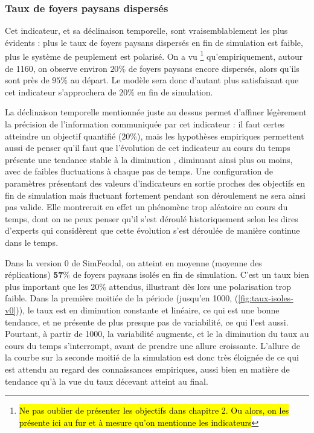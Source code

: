 \subsubsection{Taux de foyers paysans dispersés}

Cet indicateur, et sa déclinaison temporelle, sont vraisemblablement les plus évidents :
plus le taux de foyers paysans dispersés en fin de simulation est faible, plus le système de peuplement est polarisé.
On a vu \footnote{\hl{Ne pas oublier de présenter les objectifs dans chapitre 2. Ou alors, on les présente ici au fur et à mesure qu'on mentionne les indicateurs}} qu'empiriquement, autour de 1160, on observe environ $20\%$ de foyers paysans encore dispersés, alors qu'ils sont près de $95\%$ au départ.
Le modèle sera donc d'autant plus satisfaisant que cet indicateur s'approchera de $20\%$ en fin de simulation.

La \og déclinaison temporelle\fg{} mentionnée juste au dessus permet d'affiner légèrement la précision de l'information communiquée par cet indicateur :
il faut certes atteindre un objectif quantifié ($20\%$), mais les hypothèses empiriques permettent aussi de penser qu'il faut que l'évolution de cet indicateur au cours du temps présente une tendance stable à la diminution
, diminuant ainsi plus ou moins, avec de faibles fluctuations à chaque pas de temps.
Une configuration de paramètres présentant des valeurs d'indicateurs en sortie proches des objectifs en fin de simulation mais fluctuant fortement pendant son déroulement ne sera ainsi pas valide.
Elle montrerait en effet un phénomène trop aléatoire au cours du temps, dont on ne peux penser qu'il s'est déroulé historiquement selon les dires d'experts qui considèrent que cette évolution s'est déroulée de manière continue dans le temps.

\begin{mdframed}[backgroundcolor=gray!10,footnoteinside=false]

Dans la version 0 de SimFeodal, on atteint en moyenne (moyenne des réplications) $\textbf{57\%}$ de foyers paysans isolés en fin de simulation.
C'est un taux bien plus important que les $20\%$ attendus, illustrant dès lors une polarisation trop faible.
Dans la première moitiée de la période (jusqu'en 1000, (\cref{fig:taux-isoles-v0})), le taux est en diminution constante et linéaire, ce qui est une bonne tendance, et ne présente de plus presque pas de variabilité, ce qui l'est aussi.
Pourtant, à partir de 1000, la variabilité augmente, et le la diminution du taux au cours du temps s'interrompt, avant de prendre une allure croissante.
L'allure de la courbe sur la seconde moitié de la simulation est donc très éloignée de ce qui est attendu au regard des connaissances empiriques, aussi bien en matière de tendance qu'à la vue du taux décevant atteint au final.
\end{mdframed}

